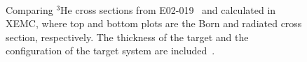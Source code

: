 \begin{figure}[!h]
  \begin{center}
    \\
    \caption[Comparing $\mathrm{^{3}He}$ cross sections from E02-019 and calculated in XEMC]{\footnotesize{Comparing $\mathrm{^{3}He}$ cross sections from E02-019~\cite{nadia_thesis} and calculated in XEMC, where top and bottom plots are the Born and radiated cross section, respectively. The thickness of the target and the configuration of the target system are included~\cite{nadia_thesis}.}}
    \label{xs_nadia_com1}
  \end{center}
\end{figure}
